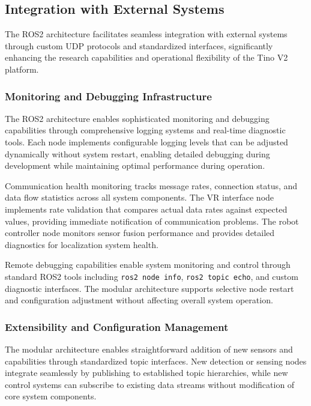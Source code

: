 \subsection{Integration with External Systems}

The ROS2 architecture facilitates seamless integration with external systems through custom UDP protocols and standardized interfaces, significantly enhancing the research capabilities and operational flexibility of the Tino V2 platform.

\subsubsection{Monitoring and Debugging Infrastructure}

The ROS2 architecture enables sophisticated monitoring and debugging capabilities through comprehensive logging systems and real-time diagnostic tools. Each node implements configurable logging levels that can be adjusted dynamically without system restart, enabling detailed debugging during development while maintaining optimal performance during operation.

Communication health monitoring tracks message rates, connection status, and data flow statistics across all system components. The VR interface node implements rate validation that compares actual data rates against expected values, providing immediate notification of communication problems. The robot controller node monitors sensor fusion performance and provides detailed diagnostics for localization system health.

Remote debugging capabilities enable system monitoring and control through standard ROS2 tools including \texttt{ros2 node info}, \texttt{ros2 topic echo}, and custom diagnostic interfaces. The modular architecture supports selective node restart and configuration adjustment without affecting overall system operation.

\subsubsection{Extensibility and Configuration Management}

The modular architecture enables straightforward addition of new sensors and capabilities through standardized topic interfaces. New detection or sensing nodes integrate seamlessly by publishing to established topic hierarchies, while new control systems can subscribe to existing data streams without modification of core system components.

